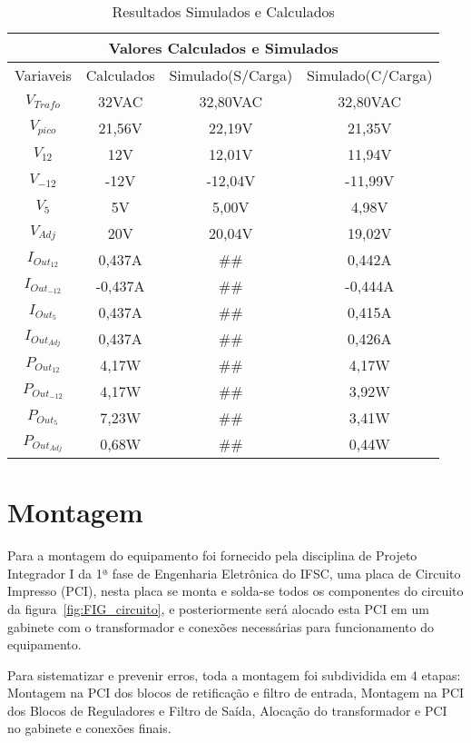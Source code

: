 \documentclass[
	article,			%
	11pt,				%
	oneside,			%
	a4paper,			%
	english,			%
	brazil,				%
	sumario=tradicional
	]{abntex2}
\begin{document}
\begin{table}[htb!]
  \centering
  \caption{Resultados Simulados e Calculados}
  \label{tab:TABLE_simula}
  \begin{tabular}{|c|c|c|c|}
    \hline
    \multicolumn{4}{|c|}{\textbf{Valores Calculados e Simulados}}\\	\hline
    Variaveis&Calculados&Simulado(S/Carga)&Simulado(C/Carga)\\	\hline\hline
    $V_{Trafo}$&32VAC&32,80VAC&32,80VAC\\	\hline
	$V_{pico}$&21,56V&22,19V&21,35V\\	\hline
	$V_{12}$&12V&12,01V&11,94V\\	\hline
	$V_{-12}$&-12V&-12,04V&-11,99V \\	\hline
	$V_{5}$&5V&5,00V&4,98V\\	\hline
	$V_{Adj}$&20V&20,04V&19,02V \\	\hline\hline
	$I_{Out_{12}}$&0,437A&\#\# &0,442A\\	\hline
	$I_{Out_{-12}}$&-0,437A&\#\# &-0,444A \\	\hline
	$I_{Out_{5}}$&0,437A&\#\# &0,415A\\	\hline
	$I_{Out_{Adj}}$&0,437A&\#\# & 0,426A\\	\hline\hline
	$P_{Out_{12}}$&4,17W&\#\# &4,17W\\	\hline
	$P_{Out_{-12}}$&4,17W&\#\# &3,92W\\	\hline
	$P_{Out_{5}}$&7,23W&\#\# &3,41W\\	\hline
	$P_{Out_{Adj}}$&0,68W&\#\# &0,44W\\	\hline	
  \end{tabular}
\end{table}
%
%
%
%
%
\section{Montagem}

Para a montagem do equipamento foi fornecido pela disciplina de Projeto Integrador I da 1ª fase de Engenharia Eletrônica do IFSC, uma placa de Circuito Impresso (PCI), nesta placa se monta e solda-se todos os componentes do circuito da figura~\ref{fig:FIG_circuito}, e posteriormente será alocado esta PCI em um gabinete com o transformador e conexões necessárias para funcionamento do equipamento. 

Para sistematizar e prevenir erros, toda a montagem foi subdividida em 4 etapas: Montagem na PCI dos blocos de retificação e filtro de entrada, Montagem na PCI dos Blocos de Reguladores e Filtro de Saída, Alocação do transformador e PCI no gabinete e conexões finais. 
\end{document}
